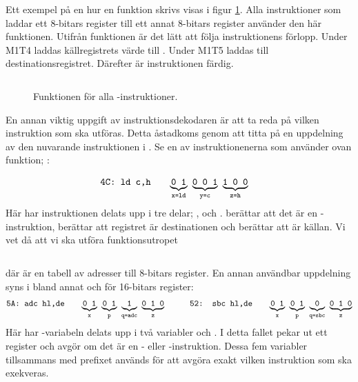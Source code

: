 \documentclass[main.tex]{subfiles}
\begin{document}
Ett exempel på en hur en funktion skrivs visas i figur \ref{fig:ld}. Alla
instruktioner som laddar ett 8-bitars register till ett annat 8-bitars register
använder den här funktionen. Utifrån funktionen är det lätt att följa
instruktionens förlopp. Under M1T4 laddas källregistrets värde till .
Under M1T5 laddas  till destinationsregistret. Därefter är
instruktionen färdig.
\begin{figure}
    \inputminted{vhdl}{lst/vhdl_instr.vhd}
    \caption{Funktionen för alla -instruktioner.}
    \label{fig:ld}
\end{figure}

En annan viktig uppgift av instruktionsdekodaren är att ta reda på vilken
instruktion som ska utföras. Detta åstadkoms genom att titta på en uppdelning
av den nuvarande instruktionen i . Se en av instruktionenerna som
använder ovan funktion; :

\begin{align*}
    &\texttt{4C: ld c,h}& \quad &
    {\underbrace{\texttt{0 1}}_{\texttt{x=ld}}}\texttt{ }
    {\underbrace{\texttt{0 0 1}}_{\texttt{y=c}}}\texttt{ }
    {\underbrace{\texttt{1 0 0}}_{\texttt{z=h}}}
\end{align*}
Här har instruktionen delats upp i tre delar; ,  och .
 berättar att det är en -instruktion,  berättar
att registret  är destinationen och  berättar att  är
källan. Vi vet då att vi ska utföra funktionsutropet
\begin{center}
    \inputminted{vhdl}{lst/vhdl_ld.vhd}
\end{center}
där  är en tabell av adresser till 8-bitars register. En annan
användbar uppdelning syns i bland annat  och  för 16-bitars
register:
\begin{align*}
    &\texttt{5A: adc hl,de}& \quad &
    {\underbrace{\texttt{0 1}}_{\texttt{x}}}\texttt{ }
    {\underbrace{\texttt{0 1}}_{\texttt{p}}}\texttt{ }
    {\underbrace{\texttt{1}}_{\texttt{q=adc}}}\texttt{ }
    {\underbrace{\texttt{0 1 0}}_{\texttt{z}}}
    \qquad
    &\texttt{52: sbc hl,de}& \quad &
    {\underbrace{\texttt{0 1}}_{\texttt{x}}}\texttt{ }
    {\underbrace{\texttt{0 1}}_{\texttt{p}}}\texttt{ }
    {\underbrace{\texttt{0}}_{\texttt{q=sbc}}}\texttt{ }
    {\underbrace{\texttt{0 1 0}}_{\texttt{z}}}
\end{align*}
Här har -variabeln delats upp i två variabler  och .
I detta fallet pekar  ut ett register och  avgör om det är en
- eller -instruktion. Dessa fem variabler tillsammans med
prefixet används för att avgöra exakt vilken instruktion som ska exekveras.
\end{document}
